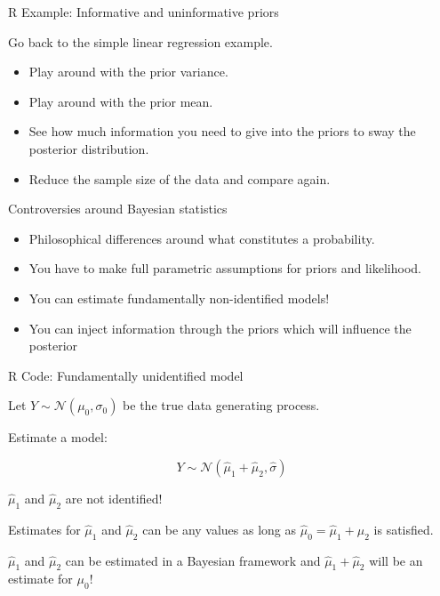 \documentclass[10pt,handout]{beamer}
\begin{document}
\begin{frame}[c]{R Example: Informative and uninformative priors}

  \begin{block}{Go back to the simple linear regression example.}
    
  \end{block}
  \begin{itemize}
    \item Play around with the prior variance.
    \item Play around with the prior mean.
    \item See how much information you need to give into the priors to sway the posterior distribution.
    \item Reduce the sample size of the data and compare again.
  \end{itemize}
  
\end{frame}





\begin{frame}[t]{Controversies around Bayesian statistics}

  \begin{itemize}
    \item Philosophical differences around what constitutes a probability.
    \item You have to make full parametric assumptions for priors and likelihood.
    \item You can estimate fundamentally non-identified models!
    \item You can inject information through the priors which will influence the posterior

  \end{itemize}

\end{frame}

\begin{frame}[c]{R Code: Fundamentally unidentified model}

  Let $Y \sim \mathcal{N}\left(\mu_0, \sigma_0\right)$ be the true data generating process.

  \vspace{1em}

  \vspace{1em}

  Estimate a model:

  $$
  Y \sim \mathcal{N}\left(\hat\mu_1 + \hat\mu_2, \hat\sigma\right)
  $$

  {\color{red}$\hat\mu_1$ and $\hat\mu_2$ are not identified!}

  \vspace{1em}

  Estimates for $\hat\mu_1$ and $\hat\mu_2$ can be any values as long as $\hat\mu_0 = \hat\mu_1 + \hat\mu_2$ is satisfied.

  \vspace{1em}

  $\hat\mu_1$ and $\hat\mu_2$ can be estimated in a Bayesian framework and $\hat\mu_1 + \hat\mu_2$ will be an estimate for $\mu_0$!

\end{frame}
\end{document}
